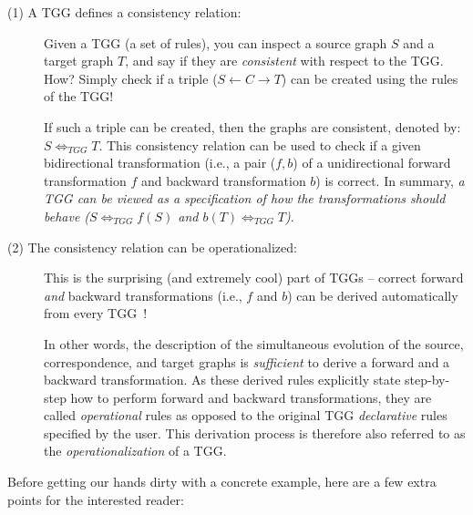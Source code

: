 \begin{description}

\item[(1) A TGG defines a consistency relation:]%
Given a TGG (a set of rul\-es), you can inspect a source graph $S$ and a target graph $T$, and say if they are \emph{consistent} with respect to the TGG. 
How? Simply check if a triple ($S\leftarrow C\rightarrow T$) can be created using the rules of the TGG!

\vspace{0.25cm}

If such a triple can be created, then the graphs are consistent, denoted by: $S \Leftrightarrow_{TGG} T$. This consistency relation can be used to check if a given bidirectional transformation (i.e., a pair ($f,b$) of a unidirectional forward transformation $f$ and backward transformation $b$) is correct. 
In summary, \emph{a TGG can be viewed as a specification of how the transformations \emph{should} behave ($S \Leftrightarrow_{TGG} f(S)$ and $b(T) \Leftrightarrow_{TGG} T$)}.
	
\item[(2) The consistency relation can be operationalized:]%
This is the surprising (and extremely cool) part of TGGs -- correct forward \emph{and} backward transformations (i.e., $f$ and $b$) can be derived automatically from every TGG~\cite{Giese2010,Hermann2011a}! 

\vspace{0.25cm}

In other words, the description of the simultaneous evolution of the source, correspondence, and target graphs is \emph{sufficient} to derive a forward and a backward transformation. 
As these derived rules explicitly state step-by-step how to perform forward and backward transformations, they are called \emph{operational} rules  as opposed to the original TGG \emph{declarative} rules specified by the user. 
This derivation process is therefore also referred to as the \emph{operationalization} of a TGG.
	
\end{description}

Before getting our hands dirty with a concrete example, here are a few extra points for the interested reader:  

